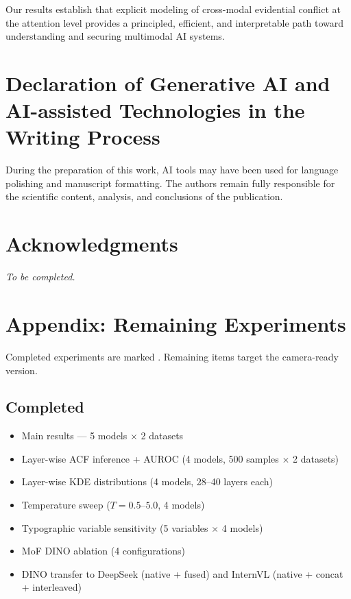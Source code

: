 \documentclass[preprint,12pt]{elsarticle}
\begin{document}
Our results establish that explicit modeling of cross-modal evidential conflict at the attention level provides a principled, efficient, and interpretable path toward understanding and securing multimodal AI systems.


\section*{Declaration of Generative AI and AI-assisted Technologies in the Writing Process}
During the preparation of this work, AI tools may have been used for language polishing and manuscript formatting. The authors remain fully responsible for the scientific content, analysis, and conclusions of the publication.

\section*{Acknowledgments}
\textit{To be completed.}

\section*{Appendix: Remaining Experiments}

Completed experiments are marked \checkmark. Remaining items target the camera-ready version.

\subsection*{Completed}
\begin{itemize}[leftmargin=*]
    \item[\checkmark] Main results — 5 models $\times$ 2 datasets
    \item[\checkmark] Layer-wise ACF inference + AUROC (4 models, 500 samples $\times$ 2 datasets)
    \item[\checkmark] Layer-wise KDE distributions (4 models, 28--40 layers each)
    \item[\checkmark] Temperature sweep ($T{=}0.5$--$5.0$, 4 models)
    \item[\checkmark] Typographic variable sensitivity (5 variables $\times$ 4 models)
    \item[\checkmark] MoF DINO ablation (4 configurations)
    \item[\checkmark] DINO transfer to DeepSeek (native + fused) and InternVL (native + concat + interleaved)
\end{itemize}
\end{document}
